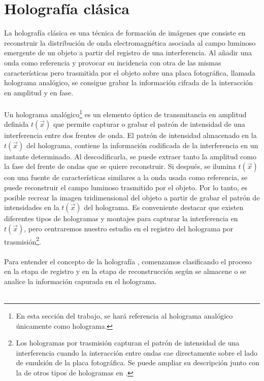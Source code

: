 \documentclass[12pt]{article}
\begin{document}
\section{Holografía clásica}
La holografía clásica es una técnica de formación de imágenes que consiste en reconstruir la distribución de onda electromagnética asociada al campo luminoso emergente de un objeto  a partir del registro  de una interferencia. Al añadir una onda como referencia y provocar su incidencia con otra de las mismas características pero  trasmitida por el objeto  sobre una placa fotográfica, llamada holograma analógico, se consigue grabar la información cifrada de la interacción en amplitud y en fase.  \\ \\
Un holograma analógico\footnote{En esta sección del trabajo, se hará referencia al holograma analógico únicamente  como holograma.} es un elemento óptico de transmitancia en amplitud definida  $t(\Vec{x})$ que permite capturar o grabar el patrón de intensidad de una interferencia entre  dos frentes de onda. El patrón de intensidad almacenado en la $t(\Vec{x})$  del holograma, contiene la información codificada de la interferencia en un instante determinado. Al descodificarla, se puede extraer tanto la amplitud como la fase del frente de ondas que se quiere reconstruir. Si después, se ilumina $t(\Vec{x})$ con una fuente de  características similares a la onda usada como referencia, se puede reconstruir el campo luminoso trasmitido por el objeto. Por lo tanto, es posible recrear  la imagen tridimensional del objeto a partir de grabar el patrón de intensidades  en la $t (\vec{x})$ del holograma. Es conveniente destacar que existen diferentes tipos de hologramas y montajes para capturar la interferencia en $t (\vec{x})$, pero centraremos nuestro estudio en el registro del holograma por trasmisión\footnote{Los hologramas por trasmisión capturan el patrón de intensidad de una interferencia  cuando la interacción entre ondas cae directamente sobre el lado de emulsión de la placa fotográfica. Se puede ampliar su descripción junto con la de otros tipos de hologramas en  \cite{4}.}. \\ \\
Para entender el concepto de la holografía \cite{5}, comenzamos clasificando el proceso en la etapa de registro y en la etapa de reconstrucción según se almacene o se analice la información capurada en el holograma. \\ \\
\end{document}
